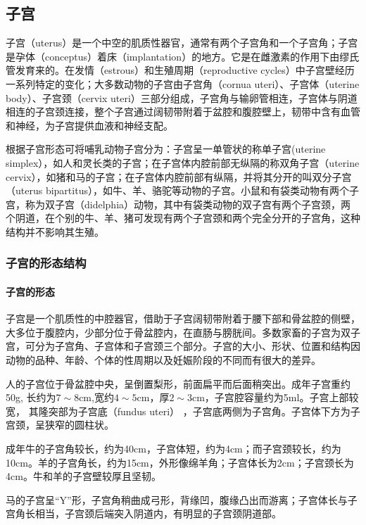 \subsection{子宫}

子宫（uterus）是一个中空的肌质性器官，通常有两个子宫角和一个子宫角；子宫是孕体（conceptus）着床（implantation）的地方。它是在雌激素的作用下由缪氏管发育来的。在发情（estrous）和生殖周期（reproductive cycles）中子宫壁经历一系列特定的变化；大多数动物的子宫由子宫角（cornua uteri）、子宫体（uterine body）、子宫颈（cervix uteri）三部分组成，子宫角与输卵管相连，子宫体与阴道相连的子宫颈连接，整个子宫通过阔韧带附着于盆腔和腹腔壁上，韧带中含有血管和神经，为子宫提供血液和神经支配。

根据子宫形态可将哺乳动物子宫分为：子宫呈一单管状的称单子宫(uterine simplex），如人和灵长类的子宫；在子宫体内腔前部无纵隔的称双角子宫（uterine cervix），如猪和马的子宫；在子宫体内腔前部有纵隔，并将其分开的叫双分子宫（uterus bipartitus），如牛、羊、骆驼等动物的子宫。小鼠和有袋类动物有两个子宫，称为双子宫（didelphia）动物，其中有袋类动物的双子宫有两个子宫颈，两个阴道，在个别的牛、羊、猪可发现有两个子宫颈和两个完全分开的子宫角，这种结构并不影响其生殖。

\subsubsection{子宫的形态结构}

\paragraph{子宫的形态}

子宫是一个肌质性的中腔器官，借助于子宫阔韧带附着于腰下部和骨盆腔的侧壁，大多位于腹腔内，少部分位于骨盆腔内，在直肠与膀胱间。多数家畜的子宫为双子宫，可分为子宫角、子宫体和子宫颈三个部分。子宫的大小、形状、位置和结构因动物的品种、年龄、个体的性周期以及妊娠阶段的不同而有很大的差异。

人的子宫位于骨盆腔中央，呈倒置梨形，前面扁平而后面稍突出。成年子宫重约50g, 长约$ 为7\sim 8 $cm,宽约$ 4\sim 5 $cm，厚$ 2\sim 3 $cm，子宫腔容量约为5ml。子宫上部较宽， 其隆突部为子宫底（fundus uteri） ，子宫底两侧为子宫角。子宫体下方为子宫颈，呈狭窄的圆柱状。

成年牛的子宫角较长，约为40cm，子宫体短，约为4cm；而子宫颈较长，约为 10cm。羊的子宫角长，约为15cm，外形像绵羊角；子宫体长为2cm；子宫颈长为4cm。牛和羊的子宫壁较厚且坚韧。

马的子宫呈“Y”形，子宫角稍曲成弓形，背缘凹，腹缘凸出而游离；子宫体长与子宫角长相当，子宫颈后端突入阴道内，有明显的子宫颈阴道部。

